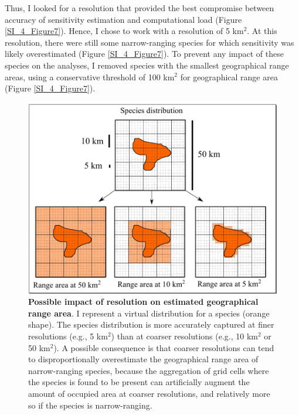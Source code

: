 Thus, I looked for a resolution that provided the best compromise between accuracy of sensitivity estimation and computational load (Figure \ref{SI_4_Figure7}).
Hence, I chose to work with a resolution of 5 km$^2$. At this resolution, there were still some narrow-ranging species for which sensitivity was likely overestimated (Figure \ref{SI_4_Figure7}). To prevent any impact of these species on the analyses, I removed species with the smallest geographical range areas, using a conservative threshold of 100 km$^2$ for geographical range area (Figure \ref{SI_4_Figure7}).

\vspace{0.5cm}
\begin{figure}[h!]
\centering
\includegraphics[scale=0.6]{Supporting/Chapter4/Figures/ResolutionConcept.png}
\caption[Possible impact of resolution on estimated geographical range area]{\textbf{Possible impact of resolution on estimated geographical range area}. I represent a virtual distribution for a species (orange shape). The species distribution is more accurately captured at finer resolutions (e.g., 5 km$^2$) than at coarser resolutions (e.g., 10 km$^2$ or 50 km$^2$). A possible consequence is that coarser resolutions can tend to disproportionally overestimate the geographical range area of narrow-ranging species, because the aggregation of grid cells where the species is found to be present can artificially augment the amount of occupied area at coarser resolutions, and relatively more so if the species is narrow-ranging.}
\label{SI_4_Figure6}
\end{figure}
  
